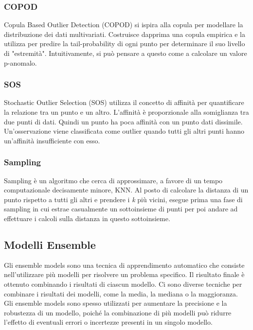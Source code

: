 \subsubsection{COPOD}
Copula Based Outlier Detection (COPOD) si ispira alla copula per modellare la distribuzione dei dati multivariati. Costruisce dapprima una copula empirica e la utilizza per predire la tail-probability di ogni punto per determinare il suo
livello di "estremità". Intuitivamente, si può pensare a questo come a calcolare
un valore p-anomalo.

\subsubsection{SOS}
Stochastic Outlier Selection (SOS) utilizza il concetto di affinità per quantificare la relazione tra un punto e un altro. L'affinità è proporzionale alla somiglianza tra due punti di dati. Quindi un punto ha poca affinità con un punto dati dissimile. 
Un'osservazione viene classificata come outlier quando tutti gli altri punti hanno un'affinità insufficiente con esso.

\subsubsection{Sampling}
Sampling è un algoritmo che cerca di approssimare, a favore di un tempo computazionale decisamente minore, KNN. Al posto di calcolare la distanza di un punto rispetto a tutti gli altri e prendere i \textit{k} più vicini, esegue prima una fase di sampling in cui estrae casualmente un sottoinsieme di punti per poi andare ad effettuare i calcoli sulla distanza in questo sottoinsieme.

\subsection{Modelli Ensemble}
Gli ensemble models sono una tecnica di apprendimento automatico che consiste nell'utilizzare più modelli per risolvere un problema specifico. Il risultato finale è ottenuto combinando i risultati di ciascun modello. Ci sono diverse tecniche per combinare i risultati dei modelli, come la media, la mediana o la maggioranza. Gli ensemble models sono spesso utilizzati per aumentare la precisione e la robustezza di un modello, poiché la combinazione di più modelli può ridurre l'effetto di eventuali errori o incertezze presenti in un singolo modello.


